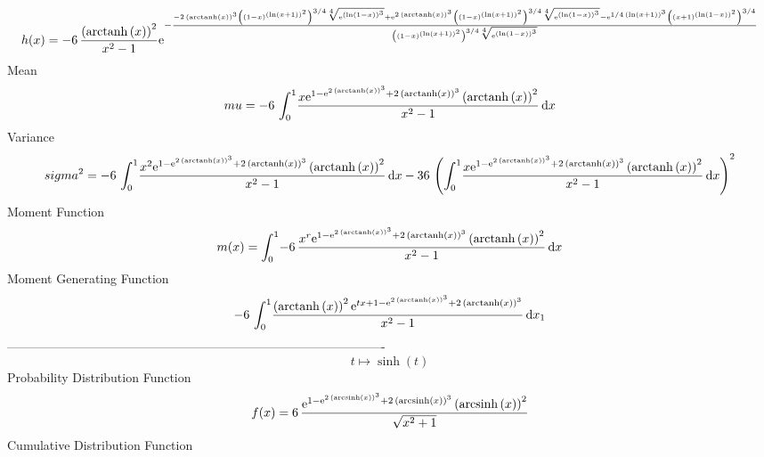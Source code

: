 \documentclass[12pt]{article}
\begin{document}
 $$ h(x)=-6\,{\frac { \left( {\rm arctanh} \left(x\right) \right) ^{2}}{{x}^{2}
-1}{{\rm e}^{-{\frac {-2\, \left( {\rm arctanh} \left(x\right)
 \right) ^{3} \left(  \left( 1-x \right) ^{ \left( \ln  \left( x+1
 \right)  \right) ^{2}} \right) ^{3/4}\sqrt [4]{{{\rm e}^{ \left( \ln 
 \left( 1-x \right)  \right) ^{3}}}}+{{\rm e}^{2\, \left( 
{\rm arctanh} \left(x\right) \right) ^{3}}} \left(  \left( 1-x
 \right) ^{ \left( \ln  \left( x+1 \right)  \right) ^{2}} \right) ^{3/
4}\sqrt [4]{{{\rm e}^{ \left( \ln  \left( 1-x \right)  \right) ^{3}}}}
-{{\rm e}^{1/4\, \left( \ln  \left( x+1 \right)  \right) ^{3}}}
 \left(  \left( x+1 \right) ^{ \left( \ln  \left( 1-x \right) 
 \right) ^{2}} \right) ^{3/4}}{ \left(  \left( 1-x \right) ^{ \left( 
\ln  \left( x+1 \right)  \right) ^{2}} \right) ^{3/4}\sqrt [4]{{
{\rm e}^{ \left( \ln  \left( 1-x \right)  \right) ^{3}}}}}}}}}
$$Mean 
 $$ mu=-6\,\int_{0}^{1}\!{\frac {x{{\rm e}^{1-{{\rm e}^{2\, \left( 
{\rm arctanh} \left(x\right) \right) ^{3}}}+2\, \left( {\rm arctanh} 
\left(x\right) \right) ^{3}}} \left( {\rm arctanh} \left(x\right)
 \right) ^{2}}{{x}^{2}-1}}\,{\rm d}x
$$ Variance 
 $$ sigma^2 = -6\,\int_{0}^{1}\!{\frac {{x}^{2}{{\rm e}^{1-{{\rm e}^{2\, \left( 
{\rm arctanh} \left(x\right) \right) ^{3}}}+2\, \left( {\rm arctanh} 
\left(x\right) \right) ^{3}}} \left( {\rm arctanh} \left(x\right)
 \right) ^{2}}{{x}^{2}-1}}\,{\rm d}x-36\, \left( \int_{0}^{1}\!{\frac 
{x{{\rm e}^{1-{{\rm e}^{2\, \left( {\rm arctanh} \left(x\right)
 \right) ^{3}}}+2\, \left( {\rm arctanh} \left(x\right) \right) ^{3}}}
 \left( {\rm arctanh} \left(x\right) \right) ^{2}}{{x}^{2}-1}}
\,{\rm d}x \right) ^{2}
$$Moment Function 
 $$ m(x) = \int_{0}^{1}\!-6\,{\frac {{x}^{r}{{\rm e}^{1-{{\rm e}^{2\, \left( 
{\rm arctanh} \left(x\right) \right) ^{3}}}+2\, \left( {\rm arctanh} 
\left(x\right) \right) ^{3}}} \left( {\rm arctanh} \left(x\right)
 \right) ^{2}}{{x}^{2}-1}}\,{\rm d}x
$$ Moment Generating Function 
 $$-6\,\int_{0}^{1}\!{\frac { \left( {\rm arctanh} \left(x\right)
 \right) ^{2}{{\rm e}^{tx+1-{{\rm e}^{2\, \left( {\rm arctanh} \left(x
\right) \right) ^{3}}}+2\, \left( {\rm arctanh} \left(x\right)
 \right) ^{3}}}}{{x}^{2}-1}}\,{\rm d}x_{{1}}
$$-------------------------------------------------------------------------------------------  \\$$t\mapsto \sinh \left( t \right) 
$$Probability Distribution Function 
$$  f(x)=6\,{\frac {{{\rm e}^{1-{{\rm e}^{2\, \left( {\rm arcsinh} \left(x
\right) \right) ^{3}}}+2\, \left( {\rm arcsinh} \left(x\right)
 \right) ^{3}}} \left( {\rm arcsinh} \left(x\right) \right) ^{2}}{
\sqrt {{x}^{2}+1}}}
$$Cumulative Distribution Function  
\end{document}
